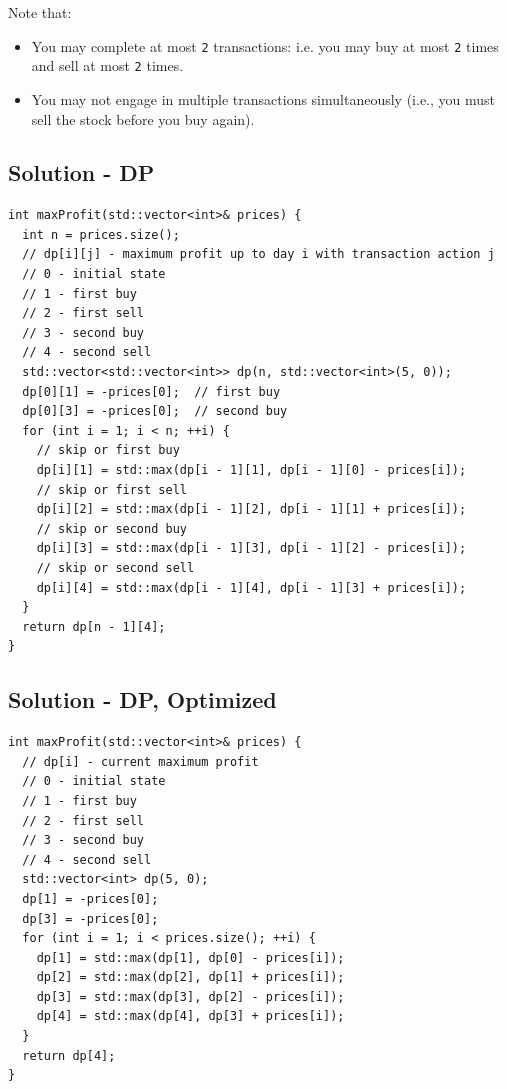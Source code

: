 Note that:
\begin{itemize}
	\item You may complete at most {\colorbox{CodeBackground}{\lstinline|2|}} transactions: i.e. you may buy at most {\colorbox{CodeBackground}{\lstinline|2|}} times and sell at most {\colorbox{CodeBackground}{\lstinline|2|}} times.
	\item You may not engage in multiple transactions simultaneously (i.e., you must sell the stock before you buy again).
\end{itemize}

\subsection*{Solution - DP}\label{solution:lc0123_dp}
\begin{lstlisting}
int maxProfit(std::vector<int>& prices) {
  int n = prices.size();
  // dp[i][j] - maximum profit up to day i with transaction action j
  // 0 - initial state
  // 1 - first buy
  // 2 - first sell
  // 3 - second buy
  // 4 - second sell
  std::vector<std::vector<int>> dp(n, std::vector<int>(5, 0));
  dp[0][1] = -prices[0];  // first buy
  dp[0][3] = -prices[0];  // second buy
  for (int i = 1; i < n; ++i) {
    // skip or first buy
    dp[i][1] = std::max(dp[i - 1][1], dp[i - 1][0] - prices[i]);
    // skip or first sell
    dp[i][2] = std::max(dp[i - 1][2], dp[i - 1][1] + prices[i]);
    // skip or second buy
    dp[i][3] = std::max(dp[i - 1][3], dp[i - 1][2] - prices[i]);
    // skip or second sell
    dp[i][4] = std::max(dp[i - 1][4], dp[i - 1][3] + prices[i]);
  }
  return dp[n - 1][4];
}
\end{lstlisting}

\subsection*{Solution - DP, Optimized}\label{solution:lc0123_dp_optimized}
\begin{lstlisting}
int maxProfit(std::vector<int>& prices) {
  // dp[i] - current maximum profit
  // 0 - initial state
  // 1 - first buy
  // 2 - first sell
  // 3 - second buy
  // 4 - second sell
  std::vector<int> dp(5, 0);
  dp[1] = -prices[0];
  dp[3] = -prices[0];
  for (int i = 1; i < prices.size(); ++i) {
    dp[1] = std::max(dp[1], dp[0] - prices[i]);
    dp[2] = std::max(dp[2], dp[1] + prices[i]);
    dp[3] = std::max(dp[3], dp[2] - prices[i]);
    dp[4] = std::max(dp[4], dp[3] + prices[i]);
  }
  return dp[4];
}
\end{lstlisting}

